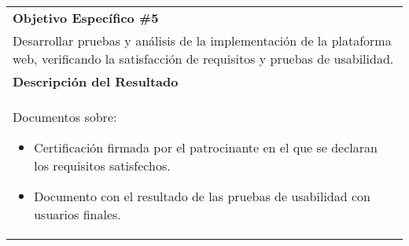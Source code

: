 \begin{table}[H]
	\centering
	\begin{tabular}{|p{\textwidth}|}
        \hline
        \textbf{Objetivo Específico \#5}
        \\
        \vspace{0.5mm}
        Desarrollar pruebas y análisis de la implementación de la
        plataforma web, verificando la satisfacción de requisitos y
        pruebas de usabilidad.
        \\ \hline
        \textbf{Descripción del Resultado}
        \\
        \vspace{0.5mm}
        Documentos sobre:
        \begin{itemize}
            \item Certificación firmada por el patrocinante en el
                que se declaran los requisitos satisfechos.
            \item Documento con el resultado de las pruebas de usabilidad con
                usuarios finales.
        \end{itemize}
        \\
        \hline
    \end{tabular}
\end{table}

